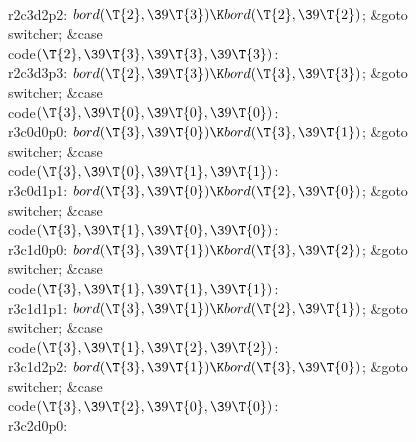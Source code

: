 \\{r2c3d2p2}:\5
${}\\{bord}(\T{2},\39\T{3})\K\\{bord}(\T{2},\39\T{2}){}$;\5
\&{goto} \\{switcher};\6
\4\&{case} \\{code}${}(\T{2},\39\T{3},\39\T{3},\39\T{3}){}$:\5
\\{r2c3d3p3}:\5
${}\\{bord}(\T{2},\39\T{3})\K\\{bord}(\T{3},\39\T{3}){}$;\5
\&{goto} \\{switcher};\6
\4\&{case} \\{code}${}(\T{3},\39\T{0},\39\T{0},\39\T{0}){}$:\5
\\{r3c0d0p0}:\5
${}\\{bord}(\T{3},\39\T{0})\K\\{bord}(\T{3},\39\T{1}){}$;\5
\&{goto} \\{switcher};\6
\4\&{case} \\{code}${}(\T{3},\39\T{0},\39\T{1},\39\T{1}){}$:\5
\\{r3c0d1p1}:\5
${}\\{bord}(\T{3},\39\T{0})\K\\{bord}(\T{2},\39\T{0}){}$;\5
\&{goto} \\{switcher};\6
\4\&{case} \\{code}${}(\T{3},\39\T{1},\39\T{0},\39\T{0}){}$:\5
\\{r3c1d0p0}:\5
${}\\{bord}(\T{3},\39\T{1})\K\\{bord}(\T{3},\39\T{2}){}$;\5
\&{goto} \\{switcher};\6
\4\&{case} \\{code}${}(\T{3},\39\T{1},\39\T{1},\39\T{1}){}$:\5
\\{r3c1d1p1}:\5
${}\\{bord}(\T{3},\39\T{1})\K\\{bord}(\T{2},\39\T{1}){}$;\5
\&{goto} \\{switcher};\6
\4\&{case} \\{code}${}(\T{3},\39\T{1},\39\T{2},\39\T{2}){}$:\5
\\{r3c1d2p2}:\5
${}\\{bord}(\T{3},\39\T{1})\K\\{bord}(\T{3},\39\T{0}){}$;\5
\&{goto} \\{switcher};\6
\4\&{case} \\{code}${}(\T{3},\39\T{2},\39\T{0},\39\T{0}){}$:\5
\\{r3c2d0p0}:\5
